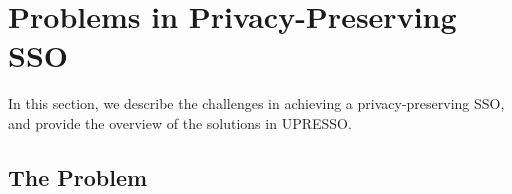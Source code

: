 ﻿\section{Problems in Privacy-Preserving SSO}
\label{sec:challenge}



In this section, we describe the challenges in achieving a privacy-preserving SSO, and provide the overview of the solutions in UPRESSO.


\subsection{The Problem}
\label{subsec:challenges}
\begin{comment}
In UPRESSO, the adversaries' goals to break the secure authentication are as follows:
\begin{itemize}
\item Impersonation attack: Adversary logs in to the honest RP as an honest user. The adversary might achieve the goal by obtaining a user's identity proof in the ways, such as stealing the proof (from the unprotected HTTP transmission), forging the valid proof (if the integrity is not guaranteed), leading the user to upload a proof valid for other RPs (the proof is not bound with specific RP).
\item Identity Injection: Honest user logs in to the honest RP under adversaries' identity. The adversary might achieve this goal by replacing the identity transmitted from IdP to RP or lead the user uploads the malicious identity proof in various ways (e.g., CSRF).
\end{itemize}
\end{comment}


